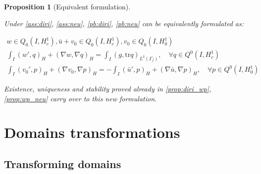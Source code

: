 \documentclass[english,a4paper,12pt,oneside]{scrbook}
\theoremstyle{break}
\newtheorem{prop}[equation]{Proposition}
\theoremstyle{remark}
\newcommand{\tr}{\text{tr}}
\begin{document}
\begin{prop}[Equivalent formulation]
\label{prop:eq_form}

Under \cref{ass:diri}, \cref{ass:neu}, \cref{pb:diri}, \cref{pb:neu} can be equivalently formulated as:

\begin{align*}
w \in Q_0(I, H^1_c), \bar{u}+v_0 \in Q_0(I,H^1_c), v_0 \in Q_0(I,H^1_0) \\
\int_I ( w' , q)_H+ (\nabla w, \nabla q)_H = \int_I(g,\tr q)_{L^2(\Gamma_f)}, \quad \forall q \in Q^0(I, H^1_c) \\
\int_I (v_0',p)_H + (\nabla v_0, \nabla p)_H= -\int_I(\bar{u}',p)_H+(\nabla \bar{u}, \nabla p)_H, \quad \forall p \in Q^0(I, H^1_0) 
\end{align*}

Existence, uniqueness and stability proved already in  \cref{prop:diri_wp}, \cref{prop:wp_neu} carry over to this new formulation.

\end{prop}

\chapter{Domains transformations}

\section{Transforming domains}
\end{document}
